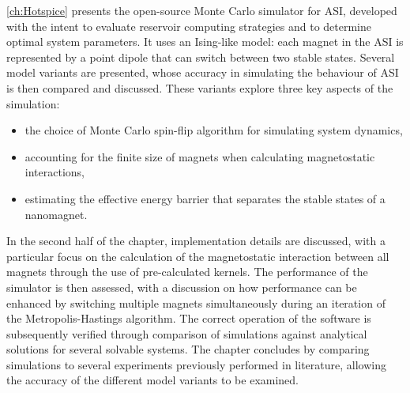 \cref{ch:Hotspice} presents the open-source \hotspice Monte Carlo simulator for ASI, developed with the intent to evaluate reservoir computing strategies and to determine optimal system parameters.
It uses an Ising-like model: each magnet in the ASI is represented by a point dipole that can switch between two stable states.
Several model variants are presented, whose accuracy in simulating the behaviour of ASI is then compared and discussed.
These variants explore three key aspects of the simulation:
\begin{itemize}[noitemsep,nolistsep] %
	\item the choice of Monte Carlo spin-flip algorithm for simulating system dynamics,
	\item accounting for the finite size of magnets when calculating magnetostatic interactions,
	\item estimating the effective energy barrier that separates the stable states of a nanomagnet.
\end{itemize}
In the second half of the chapter, implementation details are discussed, with a particular focus on the calculation of the magnetostatic interaction between all magnets through the use of pre-calculated kernels.
The performance of the simulator is then assessed, with a discussion on how performance can be enhanced by switching multiple magnets simultaneously during an iteration of the Metropolis-Hastings algorithm.
The correct operation of the software is subsequently verified through comparison of simulations against analytical solutions for several solvable systems.
The chapter concludes by comparing simulations to several experiments previously performed in literature, allowing the accuracy of the different model variants to be examined. \\

